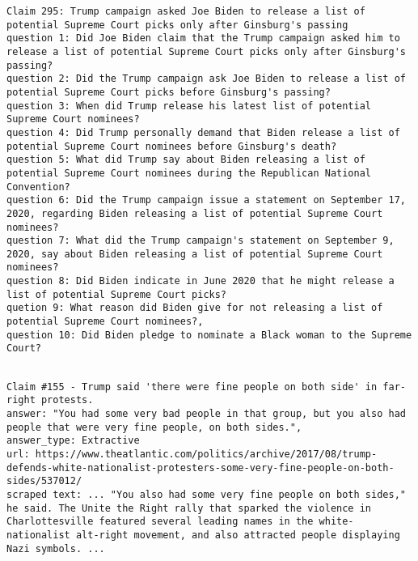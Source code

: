 \begin{lstlisting}[caption={Example of a claim and questions showing that the last tends to be unrelated or redundant to fact-checking of the claim.}, label={lst:unrelated_questions}, breaklines=true, breakatwhitespace=false, columns=fullflexible]
Claim 295: Trump campaign asked Joe Biden to release a list of potential Supreme Court picks only after Ginsburg's passing
question 1: Did Joe Biden claim that the Trump campaign asked him to release a list of potential Supreme Court picks only after Ginsburg's passing?
question 2: Did the Trump campaign ask Joe Biden to release a list of potential Supreme Court picks before Ginsburg's passing?
question 3: When did Trump release his latest list of potential Supreme Court nominees?
question 4: Did Trump personally demand that Biden release a list of potential Supreme Court nominees before Ginsburg's death?
question 5: What did Trump say about Biden releasing a list of potential Supreme Court nominees during the Republican National Convention?
question 6: Did the Trump campaign issue a statement on September 17, 2020, regarding Biden releasing a list of potential Supreme Court nominees?
question 7: What did the Trump campaign's statement on September 9, 2020, say about Biden releasing a list of potential Supreme Court nominees?
question 8: Did Biden indicate in June 2020 that he might release a list of potential Supreme Court picks?
quetion 9: What reason did Biden give for not releasing a list of potential Supreme Court nominees?,
question 10: Did Biden pledge to nominate a Black woman to the Supreme Court?
    
\end{lstlisting}

\begin{lstlisting}[caption={Example of a claim where our pipeline did not exactly extract the answer.}, label={lst:extractive_error}, breaklines=true, breakatwhitespace=false, columns=fullflexible]
Claim #155 - Trump said 'there were fine people on both side' in far-right protests.
answer: "You had some very bad people in that group, but you also had people that were very fine people, on both sides.", 
answer_type: Extractive
url: https://www.theatlantic.com/politics/archive/2017/08/trump-defends-white-nationalist-protesters-some-very-fine-people-on-both-sides/537012/
scraped text: ... "You also had some very fine people on both sides," he said. The Unite the Right rally that sparked the violence in Charlottesville featured several leading names in the white-nationalist alt-right movement, and also attracted people displaying Nazi symbols. ...
\end{lstlisting}

